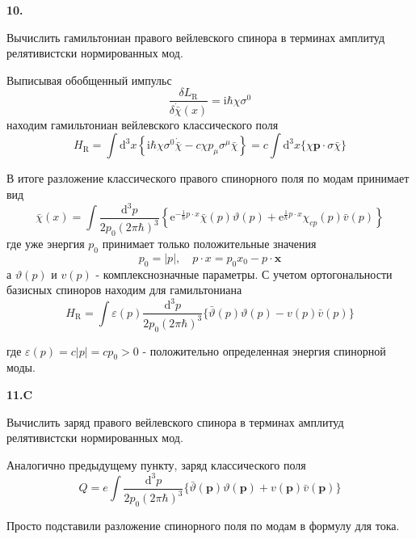 \documentclass[a4paper,12pt]{article} %
\begin{document}
\begin{ttask} \textbf{10.}
	
	 
Вычислить гамильтониан правого вейлевского спинора в терминах амплитуд релятивистски нормированных мод. 



Выписывая обобщенный импульс
$$
\frac{\delta L_{\mathrm{R}}}{\delta \dot{\bar{\chi}}(x)}=\mathrm{i} \hbar \chi \sigma^{0}
$$
находим гамильтониан вейлевского классического поля
$$
H_{\mathrm{R}}=\int \mathrm{d}^{3} x\left\{\mathrm{i} \hbar \chi \sigma^{0} \dot{\bar{\chi}}-c \chi p_{\mu} \sigma^{\mu} \bar{\chi}\right\}=c \int \mathrm{d}^{3} x\{\chi \boldsymbol{p} \cdot \sigma \bar{\chi}\}
$$

В итоге разложение классического правого спинорного поля по модам
принимает вид
$$
\bar{\chi}(x)=\int \frac{\mathrm{d}^{3} p}{2 p_{0}(2 \pi \hbar)^{3}}\left\{\mathrm{e}^{-\frac{1}{\hbar} p \cdot x} \bar{\chi}(p) \vartheta(p)+\mathrm{e}^{\frac{1}{\hbar} p \cdot x} \chi_{c p}(p) \bar{v}(p)\right\}
$$
где уже энергия $p_{0}$ принимает только положительные значения
$$
p_{0}=|p|, \quad p \cdot x=p_{0} x_{0}-p \cdot \boldsymbol{x}
$$
а $\vartheta(p)$ и $v(p)$ - комплекснозначные параметры.
С учетом ортогональности базисных спиноров находим для гамильтониана
$$
H_{\mathrm{R}}=\int \varepsilon(p) \frac{\mathrm{d}^{3} p}{2 p_{0}(2 \pi \hbar)^{3}}\{\bar{\vartheta}(p) \vartheta(p)-v(p) \bar{v}(p)\}
$$

где $\varepsilon(p)=c|p|=c p_{0}>0$ - положительно определенная энергия спинорной моды. 








\end{ttask}



\begin{ttask}\textbf{11.C}

Вычислить заряд правого вейлевского спинора в терминах амплитуд релятивистски нормированных мод.




Аналогично предыдущему пункту, заряд классического поля
$$
Q=e \int \frac{\mathrm{d}^{3} p}{2 p_{0}(2 \pi \hbar)^{3}}\{\bar{\vartheta}(\boldsymbol{p}) \vartheta(\boldsymbol{p})+v(\boldsymbol{p}) \bar{v}(\boldsymbol{p})\}
$$

Просто подставили разложение спинорного поля по модам в формулу для тока.









\end{ttask}
\end{document}
